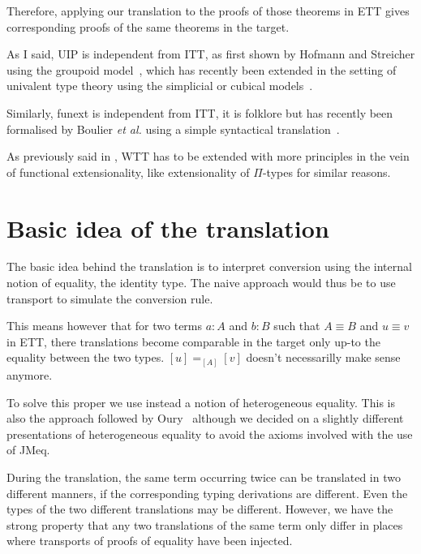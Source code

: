 Therefore, applying our translation to the proofs of those theorems in
\acrshort{ETT} gives corresponding proofs of the same theorems in the target.

As I said, \acrshort{UIP} is independent from \acrshort{ITT}, as first shown by
Hofmann and Streicher using the groupoid model~, which
has recently been extended in the setting of univalent type theory using the
simplicial or cubical models~.

Similarly, \acrshort{funext} is independent from \acrshort{ITT}, it is folklore
but has recently been formalised by Boulier \emph{et al.} using a simple
syntactical translation~.

As previously said in , \acrshort{WTT} has to be extended with
more principles in the vein of functional extensionality, like extensionality
of \(\Pi\)-types for similar reasons.

\section{Basic idea of the translation}

The basic idea behind the translation is to interpret conversion using the
internal notion of equality, \ie the identity type.
The naive approach would thus be to use transport to simulate the conversion
rule.

This means however that for two terms \(a : A\) and \(b : B\) such that
\(A \equiv B\) and \(u \equiv v\) in \acrshort{ETT}, there translations
become comparable in the target only up-to the equality
between the two types. \([u] =_{[A]} [v]\) doesn't necessarilly make sense
anymore.

To solve this proper we use instead a notion of heterogeneous equality.
This is also the approach followed by
Oury~
although we decided on a slightly different presentations of heterogeneous
equality to avoid the axioms involved with the use of \acrshort{JMeq}.

During the translation, the same term occurring twice can be
translated in two different manners, if the corresponding typing
derivations are different. Even the types of the two different
translations may be different.
%
However, we have the strong property that any two translations of the
same term only differ in places where transports of proofs of equality have been
injected.

